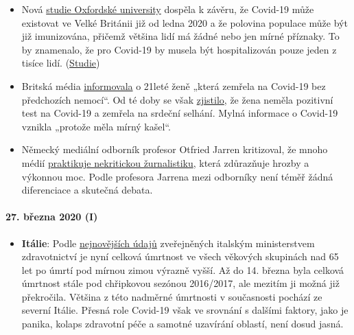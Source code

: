 \begin{itemize}
\tightlist
\item
  Nová
  \href{https://news.yahoo.com/oxford-study-suggests-millions-people-221100162.html}{studie
  Oxfordské university} dospěla k závěru, že Covid-19 může existovat ve
  Velké Británii již od ledna 2020 a že polovina populace může být již
  imunizována, přičemž většina lidí má žádné nebo jen mírné příznaky. To
  by znamenalo, že pro Covid-19 by musela být hospitalizován pouze jeden
  z tisíce lidí.
  (\href{https://www.medrxiv.org/content/10.1101/2020.03.24.20042291v1}{Studie})
\item
  Britská média
  \href{https://www.bbc.com/news/uk-england-beds-bucks-herts-52041709}{informovala}
  o 21leté ženě „která zemřela na Covid-19 bez předchozích nemocí``. Od
  té doby se však
  \href{https://archive.is/20200329015127/https:/www.theguardian.com/world/2020/mar/27/chloe-middleton-death-21-year-old-not-recorded-nhs-covid-19-related}{zjistilo},
  že žena neměla pozitivní test na Covid-19 a zemřela na srdeční
  selhání. Mylná informace o Covid-19 vznikla „protože měla mírný
  kašel``.
\item
  Německý mediální odborník profesor Otfried Jarren kritizoval, že mnoho
  médií
  \href{https://www.deutschlandfunk.de/covid-19-scharfe-kritik-an-ard-und-zdf-wegen.2849.de.html?drn:news_id=1114517}{praktikuje
  nekritickou žurnalistiku}, která zdůrazňuje hrozby a výkonnou moc.
  Podle profesora Jarrena mezi odborníky není téměř žádná diferenciace a
  skutečná debata.\\
\end{itemize}

\hypertarget{27-bux159ezna-2020-i}{%
\paragraph{27. března 2020 (I)}\label{27-bux159ezna-2020-i}}

\begin{itemize}
\tightlist
\item
  \textbf{Itálie}: Podle
  \href{http://www.salute.gov.it/portale/caldo/SISMG_sintesi_ULTIMO.pdf}{nejnovějších
  údajů} zveřejněných italským ministerstvem zdravotnictví je nyní
  celková úmrtnost ve všech věkových skupinách nad 65 let po úmrtí pod
  mírnou zimou výrazně vyšší. Až do 14. března byla celková úmrtnost
  stále pod chřipkovou sezónou 2016/2017, ale mezitím ji možná již
  překročila. Většina z této nadměrné úmrtnosti v současnosti pochází ze
  severní Itálie. Přesná role Covid-19 však ve srovnání s dalšími
  faktory, jako je panika, kolaps zdravotní péče a samotné uzavírání
  oblastí, není dosud jasná.\\
\end{itemize}

